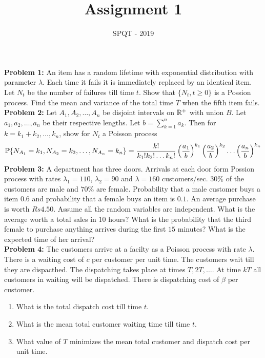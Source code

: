 \documentclass[a4paper,10pt,english]{article}
\title{Assignment 1}
\author{SPQT - 2019}
\begin{document}
\maketitle
\textbf{Problem 1:} An item has a random lifetime with exponential distribution with parameter $\lambda$. Each time it fails it is immediately replaced by an identical item. Let $N_t$ be the number of failures till time $t$. Show that $\{N_t, t \geq 0\}$ is a Possion process. Find the mean and variance of the total time $T$ when the fifth item fails. \\
\indent \textbf{Problem 2:} Let $A_1, A_2, \ldots, A_n$ be disjoint intervals on $\R^+$ with union $B$. Let $a_1,a_2,\ldots,a_n$ be their respective lengths. Let $b = \sum_{k=1}^n a_k$. Then for $k = k_1+k_2,\ldots,k_n$, show for $N_t$ a Poisson process
\begin{align*}
\P\{N_{A_1}=k_1,N_{A_2}=k_2,\ldots,N_{A_n}=k_n\} = \frac{k!}{k_1!k_2!\ldots k_n!}\left(\frac{a_1}{b}\right)^{k_1}\left(\frac{a_2}{b}\right)^{k_2}\ldots\left(\frac{a_n}{b}\right)^{k_n}
\end{align*}
\indent \textbf{Problem 3:} A department has three doors. Arrivals at each door form Possion process with rates $\lambda_1 = 110$, $\lambda_2 = 90$ and $\lambda = 160$ customers/sec. $30\%$ of the customers are male and $70\%$ are female. Probability that a male customer buys a item $0.6$ and probability that a female buys an item is $0.1$. An average purchase is worth $Rs 4.50$. Assume all the random variables are independent. What is the average worth a total sales in $10$ hours? What is the probability that the third female to purchase anything arrives during the first $15$ minutes? What is the expected time of her arrival?\\
\indent \textbf{Problem 4:} The customers arrive at a facilty as a Poisson process with rate $\lambda$. There is a waiting cost of $c$ per customer per unit time. The customers wait till they are dispacthed. The dispatching takes place at times $T,2T,\ldots$. At time $kT$ all customers in waiting will be dispatched. There is dispatching cost of $\beta$ per customer. 
\begin{enumerate}
\item What is the total dispatch cost till time $t$.
\item What is the mean total customer waiting time till time $t$.
\item What value of $T$ minimizes the mean total customer and dispatch cost per unit time. 
\end{enumerate}
\end{document}
